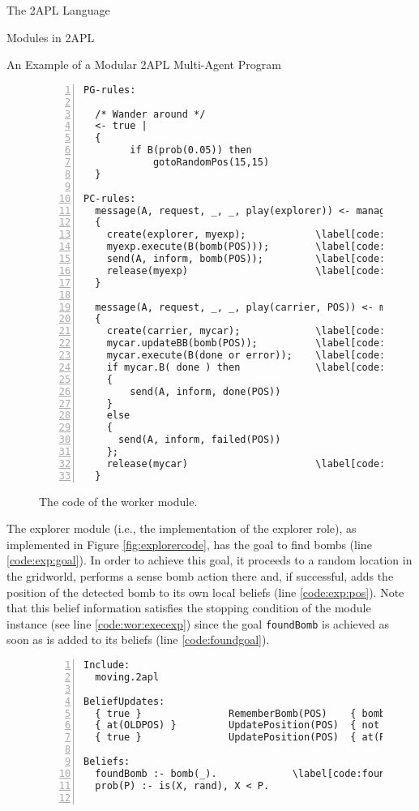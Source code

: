 \begin{chapter}{The 2APL Language}
\begin{section}{Modules in 2APL}
\begin{subsection}{An Example of a Modular 2APL Multi-Agent Program}
\begin{figure}[H]
\begin{Verbatim}[frame=single,numbers=left,firstnumber=last,
                 numbersep=2pt,commandchars=\\\[\]]
PG-rules:

  /* Wander around */
  <- true |
  {
        if B(prob(0.05)) then
            gotoRandomPos(15,15)
  }

PC-rules:
  message(A, request, _, _, play(explorer)) <- manager(A) | \label[code:wor:exp]
  {
    create(explorer, myexp);            \label[code:wor:createexp]
    myexp.execute(B(bomb(POS)));        \label[code:wor:execexp]
    send(A, inform, bomb(POS));         \label[code:wor:sendexp]
    release(myexp)                      \label[code:wor:releaseexp]
  }

  message(A, request, _, _, play(carrier, POS)) <- manager(A) | \label[code:wor:car]
  {
    create(carrier, mycar);             \label[code:wor:createcar]
    mycar.updateBB(bomb(POS));          \label[code:wor:updatecar]
    mycar.execute(B(done or error));    \label[code:car:execexp]
    if mycar.B( done ) then             \label[code:car:test]
    {
        send(A, inform, done(POS))
    }
    else
    {
      send(A, inform, failed(POS))
    };
    release(mycar)                      \label[code:car:release]
  }
\end{Verbatim}
\caption{The code of the worker module.}\label{fig:workercode}
\end{figure}

The explorer module (i.e., the implementation of the explorer role),
as implemented in Figure \ref{fig:explorercode}, has the goal to
find bombs (line \ref{code:exp:goal}). In order to achieve this
goal, it proceeds to a random location in the gridworld, performs a
sense bomb action there and, if successful, adds the position of the
detected bomb to its own local beliefs (line \ref{code:exp:pos}).
Note that this belief information satisfies the stopping condition
of the module instance (see line \ref{code:wor:execexp}) since the
goal \texttt{foundBomb} is achieved as soon as  is
added to its beliefs (line \ref{code:foundgoal}).

\begin{figure}[H]
\begin{Verbatim}[frame=single,numbers=left,firstnumber=last,
                 numbersep=2pt,commandchars=\\\[\]]
Include:
  moving.2apl

BeliefUpdates:
  { true }               RememberBomb(POS)    { bomb(POS) }
  { at(OLDPOS) }         UpdatePosition(POS)  { not at(OLDPOS), at(POS) }
  { true }               UpdatePosition(POS)  { at(POS) }

Beliefs:
  foundBomb :- bomb(_).             \label[code:foundgoal]
  prob(P) :- is(X, rand), X < P.


\end{Verbatim}
\end{figure}
\end{subsection}
\end{section}
\end{chapter}
